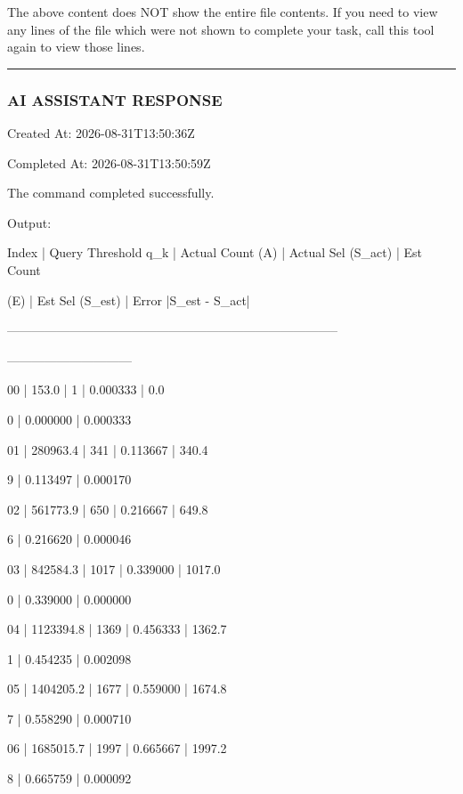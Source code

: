 \documentclass[11pt,a4paper]{article}
\begin{document}
{{{The above content does NOT show the entire file contents. If you need to view any lines of the file which were not shown to complete your task, call this tool again to view those lines.


\hrule

\subsubsection{AI ASSISTANT RESPONSE}

Created At: 2026-08-31T13:50:36Z

Completed At: 2026-08-31T13:50:59Z


The command completed successfully.

Output:

Index | Query Threshold q\_k | Actual Count (A) | Actual Sel (S\_act) | Est Count

(E) | Est Sel (S\_est) | Error |S\_est - S\_act|

--------------------------------------------------------------------------------

------------------------------

00    |             153.0 |                1 |           0.000333 |          0.0

0 |        0.000000 |            0.000333

01    |          280963.4 |              341 |           0.113667 |        340.4

9 |        0.113497 |            0.000170

02    |          561773.9 |              650 |           0.216667 |        649.8

6 |        0.216620 |            0.000046

03    |          842584.3 |             1017 |           0.339000 |       1017.0

0 |        0.339000 |            0.000000

04    |         1123394.8 |             1369 |           0.456333 |       1362.7

1 |        0.454235 |            0.002098

05    |         1404205.2 |             1677 |           0.559000 |       1674.8

7 |        0.558290 |            0.000710

06    |         1685015.7 |             1997 |           0.665667 |       1997.2

8 |        0.665759 |            0.000092

}}}
\end{document}
